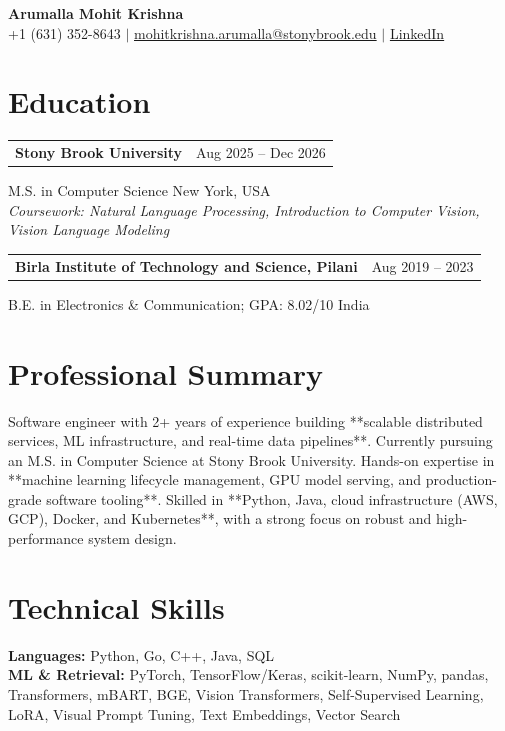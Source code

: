 \documentclass[letterpaper,10pt]{article}
\makeatletter
\newcommand{\entry}[2]{%
  \noindent
  \begin{tabularx}{\linewidth}
    {@{}>{\raggedright\arraybackslash}X@{\hspace{6pt}}r@{}}
    \textbf{#1} & #2
  \end{tabularx}\par
}
\makeatother
\begin{document}
\begin{center}
    {\LARGE\bfseries Arumalla Mohit Krishna}\\[3pt]
    +1 (631) 352-8643 $|$
    \href{mailto:mohitkrishna.arumalla@stonybrook.edu}
    {mohitkrishna.arumalla@stonybrook.edu} $|$
    \href{https://linkedin.com/in/mohit-krishna-arumalla}
    {LinkedIn}
\end{center}
\vspace{-8pt}

\section{Education}

\entry
  {Stony Brook University}
  {Aug 2025 -- Dec 2026}

M.S. in Computer Science \hfill New York, USA\\
\textit{
Coursework: Natural Language Processing,
Introduction to Computer Vision, Vision Language Modeling
}
\vspace{3pt}

\entry
  {Birla Institute of Technology and Science, Pilani}
  {Aug 2019 -- 2023}

B.E. in Electronics \& Communication; GPA: 8.02/10 \hfill India
\section{Professional Summary}

Software engineer with 2+ years of experience building **scalable distributed services, ML infrastructure, and real-time data pipelines**. Currently pursuing an M.S. in Computer Science at Stony Brook University. Hands-on expertise in **machine learning lifecycle management, GPU model serving, and production-grade software tooling**. Skilled in **Python, Java, cloud infrastructure (AWS, GCP), Docker, and Kubernetes**, with a strong focus on robust and high-performance system design.

\section{Technical Skills}

\textbf{Languages:}
Python, Go, C++, Java, SQL\\

\textbf{ML \& Retrieval:}
PyTorch, TensorFlow/Keras, scikit-learn, NumPy, pandas,
Transformers, mBART, BGE, Vision Transformers,
Self-Supervised Learning, LoRA, Visual Prompt Tuning,
Text Embeddings, Vector Search\\
\end{document}
